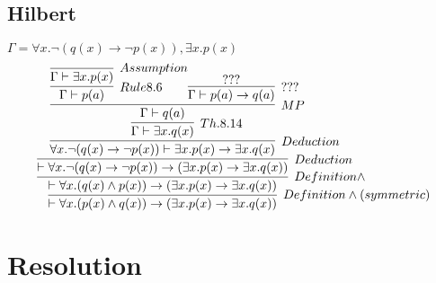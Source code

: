 \documentclass[]{article}
\begin{document}
\subsection{Hilbert}
$
\Gamma = \forall x.\neg(q(x) \rightarrow \neg p(x)), \exists x.p(x) 
$\\
$$
\infer[Definition \wedge (symmetric)]{\vdash \forall x.(p(x) \wedge q(x)) \rightarrow (\exists x.p(x) \rightarrow \exists x.q(x)) }{
	\infer[Definition \wedge]{\vdash \forall x.(q(x) \wedge p(x)) \rightarrow (\exists x.p(x) \rightarrow \exists x.q(x)) }{
		\infer[Deduction]{\vdash \forall x.\neg(q(x) \rightarrow \neg p(x)) \rightarrow (\exists x.p(x) \rightarrow \exists x.q(x)) }{
			\infer[Deduction]{ \forall x.\neg(q(x) \rightarrow \neg p(x)) \vdash \exists x.p(x) \rightarrow \exists x.q(x) }{
				\infer[Th. 8.14]{ \Gamma \vdash \exists x.q(x) }{
					\infer[MP]{ \Gamma\vdash q(a) }{
						\infer[Rule 8.6]{ \Gamma\vdash p(a)}{
							\infer[Assumption]{ \Gamma\vdash \exists x.p(x) }{}
						}
						\infer[???]{ \Gamma\vdash p(a)\rightarrow q(a) }{
									???							
						}
					}					
				}
			}
		}
	}
}$$
\section{Resolution}
\end{document}
